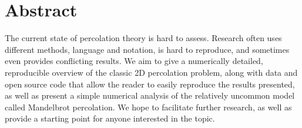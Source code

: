 

\begingroup
\let\clearpage\relax
\let\cleardoublepage\relax
\let\cleardoublepage\relax

\chapter*{Abstract}

The current state of percolation theory is hard to assess. Research often uses different methods, language and notation, is hard to reproduce, and sometimes even provides conflicting results. We aim to give a numerically detailed, reproducible overview of the classic 2D percolation problem, along with data and open source code that allow the reader to easily reproduce the results presented, as well as present a simple numerical analysis of the relatively uncommon model called Mandelbrot percolation. We hope to facilitate further research, as well as provide a starting point for anyone interested in the topic.

\endgroup			

\vfill